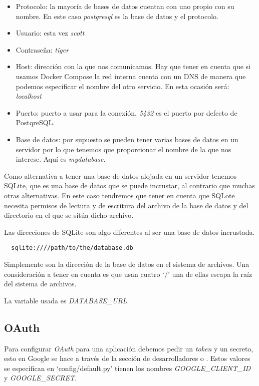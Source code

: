 \begin{itemize}
\setlength{\itemsep}{1pt}
\setlength{\parskip}{0pt}
\setlength{\parsep}{0pt}
\item Protocolo: la mayoría de bases de datos cuentan con uno propio con su nombre. En este caso \textit{postgresql} es la base de datos y el protocolo.
\item Usuario: esta vez \textit{scott}
\item Contraseña: \textit{tiger}
\item Host: dirección con la que nos comunicamos. Hay que tener en cuenta que si usamos Docker Compose la red interna cuenta con un DNS de manera que podemos especificar el nombre del otro servicio. En esta ocasión será: \textit{localhost}
\item Puerto: puerto a usar para la conexión. \textit{5432} es el puerto por defecto de PostqreSQL.
\item Base de datos: por supuesto se pueden tener varias bases de datos en un servidor por lo que tenemos que proporcionar el nombre de la que nos interese. Aquí es \textit{mydatabase}.
\end{itemize}

Como alternativa a tener una base de datos alojada en un servidor tenemos SQLite, que es una base de datos que se puede incrustar, al contrario que muchas otras alternativas. En este caso tendremos que tener en cuenta que SQLote necesita permisos de lectura y de escritura del archivo de la base de datos y del directorio en el que se sitúa dicho archivo.

Las direcciones de SQLite son algo diferentes al ser una base de datos incrustada.

\lstset{style=linestyle}
\begin{lstlisting}
  sqlite:////path/to/the/database.db
\end{lstlisting}

Simplemente son la dirección de la base de datos en el sistema de archivos. Una consideración a tener en cuenta es que usan cuatro `/' una de ellas escapa la raíz del sistema de archivos.   

La variable usada es \textit{DATABASE\_URL}.

\subsection{OAuth}

Para configurar \emph{OAuth} para una aplicación debemos pedir un \emph{token} y un secreto, esto en Google se hace a través de la sección de desarrolladores o . Estos valores se especifican en `config/default.py' tienen los nombres \textit{GOOGLE\_CLIENT\_ID} y \textit{GOOGLE\_SECRET}.


